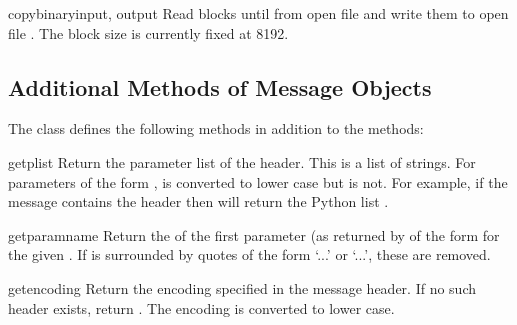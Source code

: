 \begin{funcdesc}{copybinary}{input, output}
Read blocks until \EOF{} from open file  and write them to
open file .  The block size is currently fixed at 8192.
\end{funcdesc}


\begin{seealso}
\end{seealso}


\subsection{Additional Methods of Message Objects
            \label{mimetools-message-objects}}

The  class defines the following methods in
addition to the  methods:

\begin{methoddesc}{getplist}{}
Return the parameter list of the  header.
This is a list of strings.  For parameters of the form
,  is converted to lower case but
 is not.  For example, if the message contains the header
 then
 will return the Python list \code{['spam=1',
'spam=2', 'Spam']}.
\end{methoddesc}

\begin{methoddesc}{getparam}{name}
Return the  of the first parameter (as returned by
 of the form  for the
given .  If  is surrounded by quotes of the form
`\code{<}...\code{>}' or `...', these are removed.
\end{methoddesc}

\begin{methoddesc}{getencoding}{}
Return the encoding specified in the
 message header.  If no such
header exists, return .  The encoding is converted to
lower case.
\end{methoddesc}

